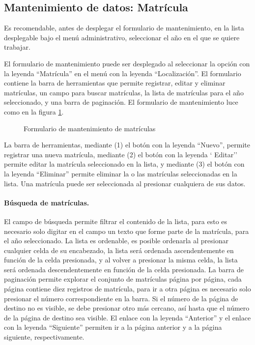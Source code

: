 \documentclass[a4paper, 9pt, conference]{article}              %
\begin{document}
\subsection{Mantenimiento de datos: Matr\'icula}
Es recomendable, antes de desplegar el formulario de mantenimiento, en la lista desplegable bajo el men\'u administrativo, seleccionar el a\~no en el que se quiere trabajar.

El formulario de mantenimiento puede ser desplegado al seleccionar la opci\'on con la leyenda ``Matr\'icula'' en el men\'u con la leyenda ``Localizaci\'on''. El formulario contiene la barra de herramientas que permite registrar, editar y eliminar matr\'iculas, un campo para buscar matr\'iculas, la lista de matr\'iculas para el a\~no seleccionado, y una barra de paginaci\'on. El formulario de mantenimiento luce como en la figura \ref{fig:geoenrollments}.

\begin{figure}
	\centering
		\caption{Formulario de mantenimiento de matr\'iculas}
	\label{fig:geoenrollments}
\end{figure}

La barra de herramientas, mediante (1) el bot\'on con la leyenda ``Nuevo'', permite registrar una nueva matr\'icula, mediante (2) el bot\'on con la leyenda ` Editar'' permite editar la matr\'icula seleccionado en la lista, y mediante (3) el bot\'on con la leyenda ``Eliminar'' permite eliminar la o las matr\'iculas seleccionadas en la lista. Una matr\'icula puede ser seleccionada al presionar cualquiera de sus datos.

\paragraph{B\'usqueda de matr\'iculas.}

El campo de b\'usqueda permite filtrar el contenido de la lista, para esto es necesario solo digitar en el campo un texto que forme parte de la matr\'icula, para el a\~no seleccionado. La lista es ordenable, es posible ordenarla al presionar cualquier celda de su encabezado, la lista ser\'a ordenada ascendentemente en funci\'on de la celda presionada, y al volver a presionar la misma celda, la lista ser\'a ordenada descendentemente en funci\'on de la celda presionada. La barra de paginaci\'on permite explorar el conjunto de matr\'iculas p\'agina por p\'agina, cada p\'agina contiene diez registros de matr\'icula, para ir a otra p\'agina es necesario solo presionar el n\'umero correspondiente en la barra. Si el n\'umero de la p\'agina de destino no es visible, se debe presionar otro m\'as cercano, as\'i hasta que el n\'umero de la p\'agina de destino sea visible. El enlace con la leyenda ``Anterior'' y el enlace con la leyenda ``Siguiente'' permiten ir a la p\'agina anterior y a la p\'agina siguiente, respectivamente.
\end{document}
